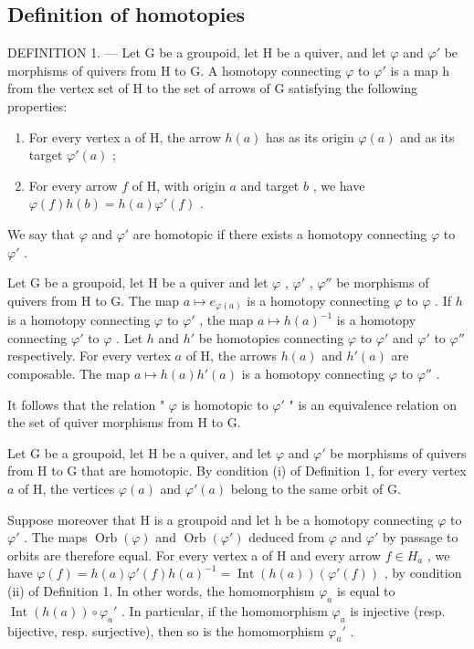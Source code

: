 \subsection{Definition of homotopies}

DEFINITION 1. --- Let G be a groupoid, let H be a quiver, and let \(\varphi\) and \(\varphi'\) be morphisms of quivers from H to G. A homotopy connecting \(\varphi\) to \(\varphi'\) is a map h from the vertex set of H to the set of arrows of G satisfying the following properties:

\begin{enumerate}
\def\labelenumi{(\roman{enumi})}
\item
  For every vertex a of H, the arrow \(h(a)\) has as its origin \(\varphi(a)\) and as its target \(\varphi'(a)\) ;
\item
  For every arrow \(f\) of H, with origin \(a\) and target \(b\) , we have \(\varphi(f)h(b)=h(a)\varphi'(f)\) .
\end{enumerate}

We say that \(\varphi\) and \(\varphi'\) are homotopic if there exists a homotopy connecting \(\varphi\) to \(\varphi'\) .

Let G be a groupoid, let H be a quiver and let \(\varphi\) , \(\varphi'\) , \(\varphi''\) be morphisms of quivers from H to G. The map \(a \mapsto e_{\varphi(a)}\) is a homotopy connecting \(\varphi\) to \(\varphi\) . If \(h\) is a homotopy connecting \(\varphi\) to \(\varphi'\) , the map \(a \mapsto h(a)^{-1}\) is a homotopy connecting \(\varphi'\) to \(\varphi\) . Let \(h\) and \(h'\) be homotopies connecting \(\varphi\) to \(\varphi'\) and \(\varphi'\) to \(\varphi''\) respectively. For every vertex \(a\) of H, the arrows \(h(a)\) and \(h'(a)\) are composable. The map \(a \mapsto h(a)h'(a)\) is a homotopy connecting \(\varphi\) to \(\varphi''\) .

It follows that the relation " \(\varphi\) is homotopic to \(\varphi'\) " is an equivalence relation on the set of quiver morphisms from H to G.

Let G be a groupoid, let H be a quiver, and let \(\varphi\) and \(\varphi'\) be morphisms of quivers from H to G that are homotopic. By condition (i) of Definition 1, for every vertex \(a\) of H, the vertices \(\varphi(a)\) and \(\varphi'(a)\) belong to the same orbit of G.

Suppose moreover that H is a groupoid and let h be a homotopy connecting \(\varphi\) to \(\varphi'\) . The maps \(\operatorname{Orb}(\varphi)\) and \(\operatorname{Orb}(\varphi')\) deduced from \(\varphi\) and \(\varphi'\) by passage to orbits are therefore equal. For every vertex a of H and every arrow \(f \in H_{a}\) , we have \(\varphi(f) = h(a)\varphi'(f)h(a)^{-1} = \operatorname{Int}(h(a))(\varphi'(f))\) , by condition (ii) of Definition 1. In other words, the homomorphism \(\varphi_{a}\) is equal to \(\operatorname{Int}(h(a)) \circ \varphi_{a}'\) . In particular, if the homomorphism \(\varphi_{a}\) is injective (resp. bijective, resp. surjective), then so is the homomorphism \(\varphi_{a}'\) .

